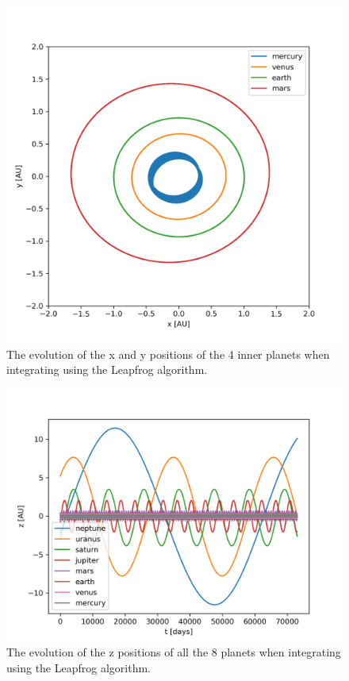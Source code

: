 \documentclass[a4paper,10pt]{article}
\begin{document}
\begin{figure}[H]
  \centering
  \includegraphics[width=.60\linewidth]{./plots/xy-leapfrog-zoom.png}
  \caption{The evolution of the x and y positions of the 4 inner planets when integrating using the Leapfrog algorithm.}
  \label{fig:xy-leap-zoom}
\end{figure}

\begin{figure}[H]
  \centering
  \includegraphics[width=.8\linewidth]{./plots/z-leapfrog.png}
  \caption{The evolution of the z positions of all the 8 planets when integrating using the Leapfrog algorithm.}
  \label{fig:z-leap}
\end{figure}
\end{document}
